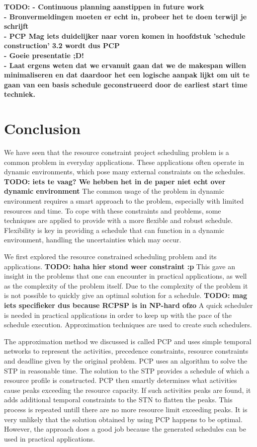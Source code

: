 \documentclass{article}
\theoremstyle{definition}
\newcommand{\TODO}[1]{{\color{red}\textbf{TODO: #1}}}
\begin{document}
\newpage

\TODO{
 - Continuous planning aanstippen in future work \\
 - Bronvermeldingen moeten er echt in, probeer het te doen terwijl je schrijft \\
 - PCP Mag iets duidelijker naar voren komen in hoofdstuk 'schedule construction' 3.2 wordt dus PCP \\
 - Goeie presentatie ;D! \\
 - Laat ergens weten dat we ervanuit gaan dat we de makespan willen minimaliseren en dat daardoor het een logische aanpak lijkt om uit te gaan van een basis schedule geconstrueerd door de earliest start time techniek. \\
 }

\newpage
 
\section{Conclusion}

We have seen that the resource constraint project scheduling problem is a common problem in everyday applications.
These applications often operate in dynamic environments, which pose many external constraints on the schedules.
\TODO{iets te vaag? We hebben het in de paper niet echt over dynamic environment}
The common usage of the problem in dynamic environment requires a smart approach to the problem, especially with limited resources and time.
To cope with these constraints and problems, some techniques are applied to provide with a more flexible and robust schedule.
Flexibility is key in providing a schedule that can function in a dynamic environment, handling the uncertainties which may occur.

We first explored the resource constrained scheduling problem and its applications. \TODO{haha hier stond weer constraint :p}
This gave an insight in the problems that one can encounter in practical applications, as well as the complexity of the problem itself.
Due to the complexity of the problem it is not possible to quickly give an optimal solution for a schedule. \TODO{mag iets specifieker dus because RCPSP is in NP-hard ofzo}
A quick scheduler is needed in practical applications in order to keep up with the pace of the schedule execution. 
Approximation techniques are used to create such schedulers.

The approximation method we discussed is called PCP and uses simple temporal networks to represent the activities, precedence constraints, resource constraints and deadline given by the original problem. 
PCP uses an algorithm to solve the STP in reasonable time. 
The solution to the STP provides a schedule of which a resource profile is constructed. 
PCP then smartly determines what activities cause peaks exceeding the resource capacity. 
If such activities peaks are found, it adds additional temporal constraints to the STN to flatten the peaks. 
This process is repeated untill there are no more resource limit exceeding peaks. 
It is very unlikely that the solution obtained by using PCP happens to be optimal. 
However, the approach does a good job because the generated schedules can be used in practical applications. 
\end{document}
